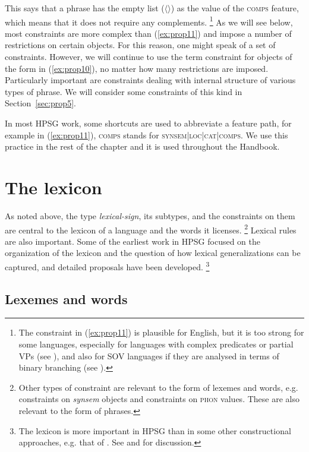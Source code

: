 \documentclass[output=paper
	        ,collection
	        ,collectionchapter
 	        ,biblatex
                ,babelshorthands
                ,newtxmath
                ,draftmode
                ,colorlinks, citecolor=brown
]{langscibook}
\begin{document}
This says that a phrase has the empty list ($\langle \rangle$) as the value of the \textsc{comps} feature, which means that it does not require any complements.%
%
\footnote{The constraint in (\ref{ex:prop11}) is plausible for English, but it is too strong for some languages, especially for languages with complex predicates or partial VPs (see ), and also for SOV languages if they are analysed in terms of binary branching (see ).}
%
As we will see below, most constraints are more complex than (\ref{ex:prop11}) and impose a number of restrictions on certain objects. For this reason, one might speak of a set of constraints. However, we will continue to use the term constraint for objects of the form in (\ref{ex:prop10}), no matter how many restrictions are imposed. Particularly important are constraints dealing with internal structure of various types of phrase. We will consider some constraints of this kind in Section~\ref{sec:prop5}.

In most HPSG work, some shortcuts are used to abbreviate a feature path, for example in (\ref{ex:prop11}), \textsc{comps} stands for \textsc{synsem|loc|cat|comps}. We use this practice in the rest of the chapter and it is used throughout the Handbook.


\section{The lexicon}\label{sec:prop4}
\label{prop:sec-lexicon}

As noted above, the type \emph{lexical-sign}, its subtypes, and the constraints on them are central to the lexicon of a language and the words it licenses.%
%
\footnote{Other types of constraint are relevant to the form of lexemes and words, e.g. constraints on \emph{synsem} objects and constraints on \textsc{phon} values. These are also relevant to the form of phrases.}
%
Lexical rules are also important. Some of the earliest work in HPSG focused on the organization of the lexicon and the question of how lexical generalizations can be captured, and detailed proposals have been developed.%
%
\footnote{The lexicon is more important in HPSG than in some other constructional approaches, e.g. that of \citet{Goldberg95a,Goldberg2006a}. See \citet{MWArgSt} and  for discussion.}
%

\subsection{Lexemes and words}\label{sec:prop4.1}
\end{document}

